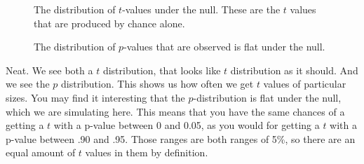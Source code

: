 \documentclass[
  letterpaper,
  DIV=11,
  numbers=noendperiod]{scrreprt}
\begin{document}
\begin{figure}


\caption{\label{fig-7nullt}The distribution of \(t\)-values under the
null. These are the \(t\) values that are produced by chance alone.}

\end{figure}%

\begin{figure}


\caption{\label{fig-7flatp}The distribution of \(p\)-values that are
observed is flat under the null.}

\end{figure}%

Neat. We see both a \(t\) distribution, that looks like \(t\)
distribution as it should. And we see the \(p\) distribution. This shows
us how often we get \(t\) values of particular sizes. You may find it
interesting that the \(p\)-distribution is flat under the null, which we
are simulating here. This means that you have the same chances of a
getting a \(t\) with a p-value between 0 and 0.05, as you would for
getting a \(t\) with a p-value between .90 and .95. Those ranges are
both ranges of 5\%, so there are an equal amount of \(t\) values in them
by definition.
\end{document}
